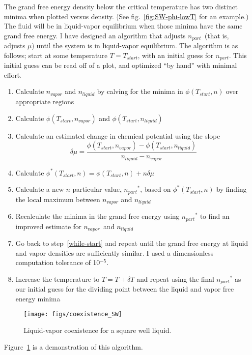 \documentclass[letterpaper,twocolumn,amsmath,amssymb,prb]{revtex4-1}
\newcommand{\npart}{\ensuremath{n_\textit{part}}}
\newcommand{\nliq}{\ensuremath{n_\textit{liquid}}}
\newcommand{\nvap}{\ensuremath{n_\textit{vapor}}}
\begin{document}
The grand free energy density below the critical temperature has two distinct minima when
plotted versus density. (See fig.~\ref{fig:SW-phi-lowT} for an
example.) The fluid will be in liquid-vapor equilibrium when those
minima have the same grand free energy. I have designed an algorithm
that adjusts \npart\ (that is, adjusts $\mu$) until the system is in
liquid-vapor equilibrium.  The algorithm is as follows; start at some
temperature $T=T_{start}$, with an initial guess for $\npart$. This
initial guess can be read off of a plot, and optimized ``by hand''
with minimal effort.
\begin{enumerate}
  \item Calculate $\nvap$ and $\nliq$ by calving for the minima in $\phi(T_{start},n)$ over appropriate regions
  \item Calculate $\phi(T_{start},\nvap)$ and $\phi(T_{start},\nliq)$ \label{while-start}
  \item Calculate an estimated change in chemical potential using the slope \[\delta\mu = \frac{\phi(T_{start},\nvap) - \phi(T_{start},\nliq)}{\nliq - \nvap}\]
  \item Calculate $\phi^*(T_{start},n) = \phi(T_{start},n) + n\delta\mu$
  \item Calculate a new $n$ particular value, $\npart^*$, based on $\phi^*(T_{start},n)$ by finding the local maximum between $\nvap$ and $\nliq$
  \item Recalculate the minima in the grand free energy using $\npart^*$ to find an improved estimate for \nvap\ and \nliq
  \item Go back to step~\ref{while-start} and repeat until the grand free energy at liquid and vapor densities are sufficiently similar. I used a dimensionless computation tolerance of 10$^{-5}$.
  \item Increase the temperature to $T = T + \delta T$ and repeat using the final $\npart^*$ as our initial guess for the dividing point between the liquid and vapor free energy minima
\end{enumerate}

\begin{figure}
  \begin{center}
  \texttt{[image: figs/coexistence\_SW]}
  \end{center}
  \caption{Liquid-vapor coexistence for a square well liquid.}
  \label{fig:coexistence_SW}
\end{figure}

Figure~\ref{fig:coexistence_SW} is a demonstration of this algorithm.
\end{document}

